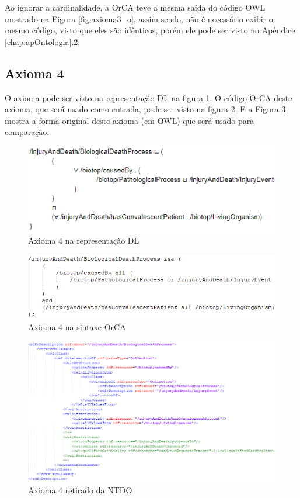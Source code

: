 \documentclass{bcc}
\begin{document}
Ao ignorar a cardinalidade, a OrCA teve a mesma saída do código OWL mostrado na Figura \ref{fig:axioma3_o}, assim sendo, não é necessário exibir o mesmo código, visto que eles são idênticos, porém ele pode ser visto no Apêndice \ref{chap:apOntologia}.2.

\subsection{Axioma 4}
O axioma pode ser visto na representação DL na figura \ref{fig:axioma4_dl}. O código OrCA deste axioma, que será usado como entrada, pode ser visto na figura \ref{fig:axioma4_orca}. E a Figura \ref{fig:axioma4_o} mostra a forma original deste axioma (em OWL) que será usado para comparação. 

\begin{figure}[H]
\centering
\includegraphics[width=.6\textwidth]{Figuras/axioma4_dl.png}
\caption{Axioma 4 na representação DL} 
\label{fig:axioma4_dl}
\end{figure}

\begin{figure}[H]
\centering
\includegraphics[width=.7\textwidth]{Figuras/axioma4_orca.png}
\caption{Axioma 4 na sintaxe OrCA} 
\label{fig:axioma4_orca}
\end{figure}

\begin{figure}[H]
\centering
\includegraphics[width=1\textwidth]{Figuras/axioma4_o.png}
\caption{Axioma 4 retirado da NTDO} 
\label{fig:axioma4_o}
\end{figure}
\end{document}
